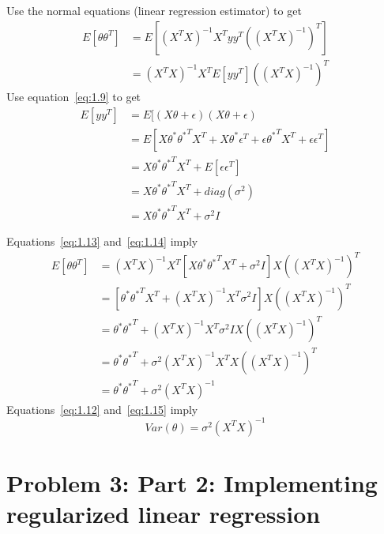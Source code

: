 \documentclass{article}
\begin{document}
Use the normal equations (linear regression estimator) to get
\begin{equation}
  \label{eq:1.13}
  \begin{split}
    E[\theta\theta^T] &= E\left[ (X^TX)^{-1} X^T yy^T \left( (X^TX)^{-1} \right)^T \right] \\    
    &= (X^TX)^{-1} X^T E[yy^T] \left( (X^TX)^{-1} \right)^T
  \end{split}
\end{equation}
Use equation~\ref{eq:1.9} to get 
\begin{equation}
  \label{eq:1.14}
  \begin{split}
    E[yy^T] &= E[(X\theta + \epsilon) (X\theta + \epsilon) \\
    &= E[X\theta^* {\theta^*}^T X^T + X\theta^*\epsilon^T + \epsilon {\theta^*}^T X^T + \epsilon\epsilon^T] \\
    &= X\theta^* {\theta^*}^T X^T + E[\epsilon\epsilon^T] \\
    &= X\theta^* {\theta^*}^T X^T + diag(\sigma^2) \\
    &= X\theta^* {\theta^*}^T X^T + \sigma^2 I
  \end{split}
\end{equation}

Equations~\ref{eq:1.13} and~\ref{eq:1.14} imply
\begin{equation}
  \label{eq:1.15}
  \begin{split}
    E[\theta\theta^T] &= (X^TX)^{-1} X^T \left[X\theta^* {\theta^*}^T X^T + \sigma^2 I \right] X\left( (X^TX)^{-1} \right)^T \\
    &= \left[\theta^* {\theta^*}^T X^T + (X^TX)^{-1} X^T \sigma^2 I \right] X \left( (X^TX)^{-1} \right)^T \\ 
    &= \theta^* {\theta^*}^T + (X^TX)^{-1} X^T \sigma^2 I X \left( (X^TX)^{-1} \right)^T \\
    &= \theta^* {\theta^*}^T + \sigma^2 (X^TX)^{-1} X^T X \left( (X^TX)^{-1} \right)^T \\
    &= \theta^* {\theta^*}^T + \sigma^2 (X^TX)^{-1}
  \end{split}
\end{equation}
Equations~\ref{eq:1.12} and~\ref{eq:1.15} imply
\begin{equation}
  \label{eq:1.16}
  Var(\theta) = \sigma^2 (X^TX)^{-1}
\end{equation}

\section{Problem 3: Part 2: Implementing regularized linear regression}
\end{document}
